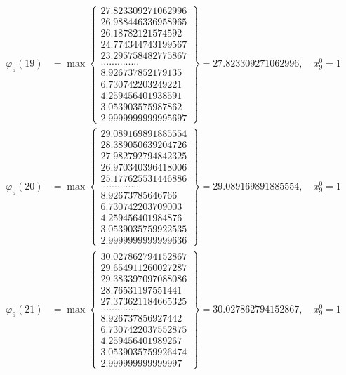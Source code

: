 \documentclass{article}
\begin{document}
\begin{align*}
  
  
  
\varphi_{9}(19) &= \max \left\{ \begin{array}{c}
27.823309271062996 \\
 26.988446336958965 \\
 26.18782121574592 \\
 24.774344743199567 \\
 23.295758482775867 \\
 .............. \\
 8.926737852179135 \\
 6.730742203249221 \\
 4.259456401938591 \\
 3.053903575987862 \\
 2.9999999999995697
\end{array} \right\} = 27.823309271062996, \quad x_{9}^0 = 1\\
  
  
  
  
\varphi_{9}(20) &= \max \left\{ \begin{array}{c}
29.089169891885554 \\
 28.389050639204726 \\
 27.982792794842325 \\
 26.970340396418006 \\
 25.177625531446886 \\
 .............. \\
 8.92673785646766 \\
 6.730742203709003 \\
 4.259456401984876 \\
 3.0539035759922535 \\
 2.9999999999999636
\end{array} \right\} = 29.089169891885554, \quad x_{9}^0 = 1\\
  
  
  
  
\varphi_{9}(21) &= \max \left\{ \begin{array}{c}
30.027862794152867 \\
 29.654911260027287 \\
 29.383397097088086 \\
 28.76531197551441 \\
 27.373621184665325 \\
 .............. \\
 8.926737856927442 \\
 6.7307422037552875 \\
 4.259456401989267 \\
 3.0539035759926474 \\
 2.999999999999997
\end{array} \right\} = 30.027862794152867, \quad x_{9}^0 = 1\\
  

\end{align*}
\end{document}
